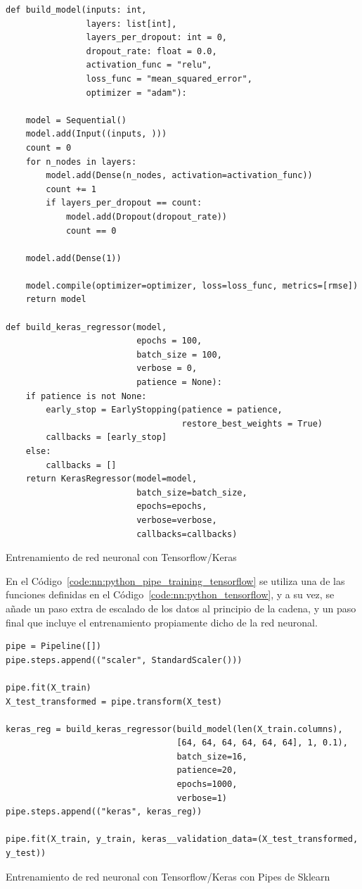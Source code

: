 \documentclass[11pt]{article}
\begin{document}
\begin{listing}
\begin{verbatim}
def build_model(inputs: int,
                layers: list[int],
                layers_per_dropout: int = 0,
                dropout_rate: float = 0.0,
                activation_func = "relu",
                loss_func = "mean_squared_error",
                optimizer = "adam"):
    
    model = Sequential()
    model.add(Input((inputs, )))
    count = 0
    for n_nodes in layers:
        model.add(Dense(n_nodes, activation=activation_func))
        count += 1
        if layers_per_dropout == count:
            model.add(Dropout(dropout_rate))
            count == 0

    model.add(Dense(1))
    
    model.compile(optimizer=optimizer, loss=loss_func, metrics=[rmse])
    return model

def build_keras_regressor(model,
                          epochs = 100,
                          batch_size = 100,
                          verbose = 0,
                          patience = None):
    if patience is not None:
        early_stop = EarlyStopping(patience = patience,
                                   restore_best_weights = True)
        callbacks = [early_stop]
    else:
        callbacks = []
    return KerasRegressor(model=model,
                          batch_size=batch_size,
                          epochs=epochs,
                          verbose=verbose,
                          callbacks=callbacks)
\end{verbatim}
\caption{Entrenamiento de red neuronal con Tensorflow/Keras}
\label{code:nn:python_tensorflow}
\end{listing}

En el Código~\ref{code:nn:python_pipe_training_tensorflow} se utiliza una de las funciones definidas en el Código~\ref{code:nn:python_tensorflow}, y a su vez, se añade un paso extra de escalado de los datos al principio de la cadena, y un paso final que incluye el entrenamiento propiamente dicho de la red neuronal. 

\begin{listing}
\begin{verbatim}
pipe = Pipeline([])
pipe.steps.append(("scaler", StandardScaler()))

pipe.fit(X_train)
X_test_transformed = pipe.transform(X_test)

keras_reg = build_keras_regressor(build_model(len(X_train.columns),
                                  [64, 64, 64, 64, 64, 64], 1, 0.1),
                                  batch_size=16,
                                  patience=20,
                                  epochs=1000,
                                  verbose=1)
pipe.steps.append(("keras", keras_reg))

pipe.fit(X_train, y_train, keras__validation_data=(X_test_transformed, y_test))
\end{verbatim}
\caption{Entrenamiento de red neuronal con Tensorflow/Keras con Pipes de Sklearn}
\label{code:nn:python_pipe_training_tensorflow}
\end{listing}
\end{document}
